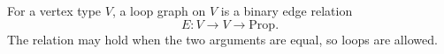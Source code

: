 \begin{definition}
For a vertex type \(V\), a loop graph on \(V\) is a binary edge relation
\[
  E \colon V \to V \to \mathrm{Prop}.
\]
The relation may hold when the two arguments are equal, so loops are allowed.
\end{definition}
